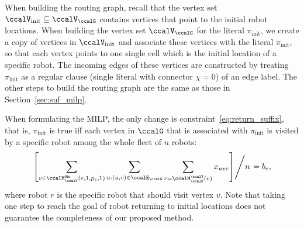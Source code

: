 \documentclass[Afour,sageh,times]{sagej}
\newcommand{\auto}[1]{\ccalA_{\textup{#1}}}
\newcommand{\autop}{\ccalA_{\phi}}
\begin{document}
{When building the routing graph, recall that the vertex set $\ccalV_\text{init} \subseteq \ccalV_\ccalG$ contains vertices that point to the initial robot locations. When building the vertex set $\ccalV_\ccalG$ for the literal $\pi_{\text{init}}$, we create a copy of vertices in $\ccalV_{\text{init}}$ and associate these vertices  with the literal $\pi_{\text{init}}$, so that each vertex points to one single cell which is the initial location of a specific robot. The incoming edges of these vertices are constructed by treating $\pi_{\text{init}}$ as a regular clause (single literal with connector $\chi=0$) of an edge label. The other steps to build the routing graph are the same as those in Section~\ref{sec:suf_milp}.

When formulating the MILP, the only change is constraint~\eqref{eq:return_suffix}, that is, $\pi_{\text{init}}$ is true iff each vertex in $\ccalG$ that is associated with  $\pi_{\text{init}}$ is visited by a specific robot among the whole fleet of $n$ robots:
\begin{align}
  \left.   \left[ \sum_{v \in \ccalM_\ccalV^\mathsf{lits}(e, 1, p_e, 1)}   \sum_{u: (u,v) \in \ccalE_\ccalG}     \sum_{r = \ccalM_{\ccalK}^\ccalV(v) }   x_{uvr} \right] \middle/ {n} \right. = b_e,
 \end{align}
where robot $r$ is the specific robot that should visit vertex $v$. Note that taking one step to reach the goal of robot returning to initial locations  does not guarantee the completeness of our proposed method.




}
\end{document}
